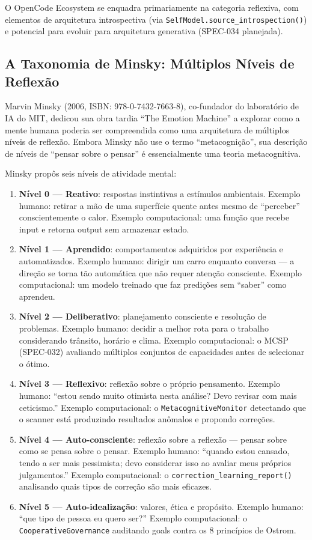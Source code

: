 O OpenCode Ecosystem se enquadra primariamente na categoria reflexiva, com elementos de arquitetura introspectiva (via \texttt{SelfModel.source\_introspection()}) e potencial para evoluir para arquitetura generativa (SPEC-034 planejada).

\subsection{A Taxonomia de Minsky: Múltiplos Níveis de Reflexão}

Marvin Minsky (2006, ISBN: 978-0-7432-7663-8), co-fundador do laboratório de IA do MIT, dedicou sua obra tardia ``The Emotion Machine'' a explorar como a mente humana poderia ser compreendida como uma arquitetura de múltiplos níveis de reflexão. Embora Minsky não use o termo ``metacognição'', sua descrição de níveis de ``pensar sobre o pensar'' é essencialmente uma teoria metacognitiva.

Minsky propôs seis níveis de atividade mental:

\begin{enumerate}
    \item \textbf{Nível 0 — Reativo}: respostas instintivas a estímulos ambientais. Exemplo humano: retirar a mão de uma superfície quente antes mesmo de ``perceber'' conscientemente o calor. Exemplo computacional: uma função que recebe input e retorna output sem armazenar estado.
    \item \textbf{Nível 1 — Aprendido}: comportamentos adquiridos por experiência e automatizados. Exemplo humano: dirigir um carro enquanto conversa — a direção se torna tão automática que não requer atenção consciente. Exemplo computacional: um modelo treinado que faz predições sem ``saber'' como aprendeu.
    \item \textbf{Nível 2 — Deliberativo}: planejamento consciente e resolução de problemas. Exemplo humano: decidir a melhor rota para o trabalho considerando trânsito, horário e clima. Exemplo computacional: o MCSP (SPEC-032) avaliando múltiplos conjuntos de capacidades antes de selecionar o ótimo.
    \item \textbf{Nível 3 — Reflexivo}: reflexão sobre o próprio pensamento. Exemplo humano: ``estou sendo muito otimista nesta análise? Devo revisar com mais ceticismo.'' Exemplo computacional: o \texttt{MetacognitiveMonitor} detectando que o scanner está produzindo resultados anômalos e propondo correções.
    \item \textbf{Nível 4 — Auto-consciente}: reflexão sobre a reflexão — pensar sobre como se pensa sobre o pensar. Exemplo humano: ``quando estou cansado, tendo a ser mais pessimista; devo considerar isso ao avaliar meus próprios julgamentos.'' Exemplo computacional: o \texttt{correction\_learning\_report()} analisando quais tipos de correção são mais eficazes.
    \item \textbf{Nível 5 — Auto-idealização}: valores, ética e propósito. Exemplo humano: ``que tipo de pessoa eu quero ser?'' Exemplo computacional: o \texttt{CooperativeGovernance} auditando goals contra os 8 princípios de Ostrom.
\end{enumerate}

